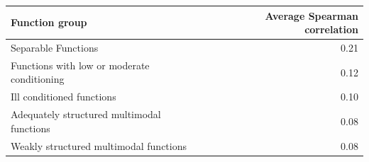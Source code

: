 \begin{tabular}{lr}
\toprule
Function group & Average Spearman correlation \\
\midrule
Separable Functions & 0.21 \\
Functions with low or moderate conditioning & 0.12 \\
Ill conditioned functions & 0.10 \\
Adequately structured multimodal functions & 0.08 \\
Weakly structured multimodal functions & 0.08 \\
\bottomrule
\end{tabular}
